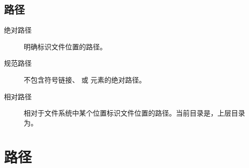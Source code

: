 \subsection{路径}
\begin{description}
	\item[\faRoad 绝对路径]明确标识文件位置的路径。
	\item[\faRoad 规范路径]不包含符号链接、 或  元素的绝对路径。
	\item[\faRoad 相对路径]相对于文件系统中某个位置标识文件位置的路径。当前目录是，上层目录为。
\end{description}

\section{路径}
\centering
\tt
